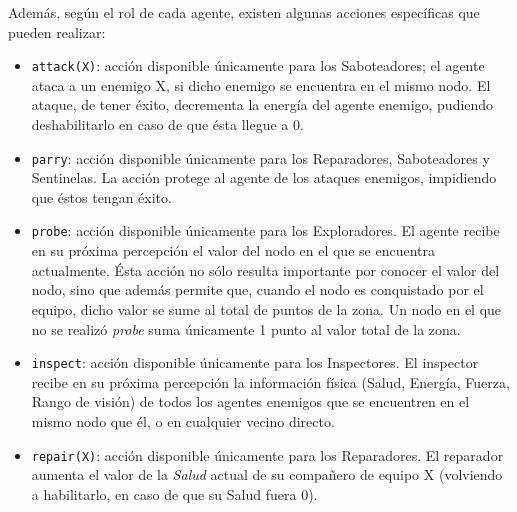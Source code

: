 Además, según el rol de cada agente, existen algunas acciones específicas 
que pueden realizar:

\begin{itemize}
	\item \texttt{attack(X)}: acción disponible únicamente para los 
    Saboteadores; el agente ataca a un enemigo X, si dicho enemigo se 
    encuentra en el mismo nodo. El ataque, de tener éxito, decrementa la 
    energía del agente enemigo, pudiendo deshabilitarlo en caso de que ésta 
    llegue a 0.
	\item \texttt{parry}: acción disponible únicamente para los 
    Reparadores, Saboteadores y Sentinelas. La acción protege al agente de 
    los ataques enemigos, impidiendo que éstos tengan éxito.
	\item \texttt{probe}: acción disponible únicamente para los 
    Exploradores. El agente recibe en su próxima percepción el valor del 
    nodo en el que se encuentra actualmente. Ésta acción no sólo resulta 
    importante por conocer el valor del nodo, sino que además permite que, 
    cuando el nodo es conquistado por el equipo, dicho valor se sume al 
    total de puntos de la zona. Un nodo en el que no se realizó 
    \textit{probe} suma únicamente 1 punto al valor total de la zona.
	\item \texttt{inspect}: acción disponible únicamente para los 
    Inspectores. El inspector recibe en su próxima percepción la 
    información física (Salud, Energía, Fuerza, Rango de visión) de todos 
    los agentes enemigos que se encuentren en el mismo nodo que él, o en 
    cualquier vecino directo.
	\item \texttt{repair(X)}: acción disponible únicamente para los 
    Reparadores. El reparador aumenta el valor de la \emph{Salud} actual de 
    su compañero de equipo X (volviendo a habilitarlo, en caso de que su 
    Salud fuera 0).
\end{itemize}

